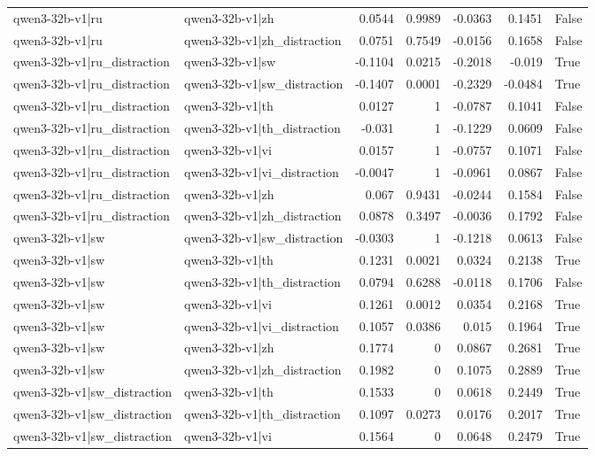 \begin{table}
\begin{tabular}{l l r r r r l}
qwen3-32b-v1|ru & qwen3-32b-v1|zh & 0.0544 & 0.9989 & -0.0363 & 0.1451 & False \\
qwen3-32b-v1|ru & qwen3-32b-v1|zh_distraction & 0.0751 & 0.7549 & -0.0156 & 0.1658 & False \\
qwen3-32b-v1|ru_distraction & qwen3-32b-v1|sw & -0.1104 & 0.0215 & -0.2018 & -0.019 & True \\
qwen3-32b-v1|ru_distraction & qwen3-32b-v1|sw_distraction & -0.1407 & 0.0001 & -0.2329 & -0.0484 & True \\
qwen3-32b-v1|ru_distraction & qwen3-32b-v1|th & 0.0127 & 1 & -0.0787 & 0.1041 & False \\
qwen3-32b-v1|ru_distraction & qwen3-32b-v1|th_distraction & -0.031 & 1 & -0.1229 & 0.0609 & False \\
qwen3-32b-v1|ru_distraction & qwen3-32b-v1|vi & 0.0157 & 1 & -0.0757 & 0.1071 & False \\
qwen3-32b-v1|ru_distraction & qwen3-32b-v1|vi_distraction & -0.0047 & 1 & -0.0961 & 0.0867 & False \\
qwen3-32b-v1|ru_distraction & qwen3-32b-v1|zh & 0.067 & 0.9431 & -0.0244 & 0.1584 & False \\
qwen3-32b-v1|ru_distraction & qwen3-32b-v1|zh_distraction & 0.0878 & 0.3497 & -0.0036 & 0.1792 & False \\
qwen3-32b-v1|sw & qwen3-32b-v1|sw_distraction & -0.0303 & 1 & -0.1218 & 0.0613 & False \\
qwen3-32b-v1|sw & qwen3-32b-v1|th & 0.1231 & 0.0021 & 0.0324 & 0.2138 & True \\
qwen3-32b-v1|sw & qwen3-32b-v1|th_distraction & 0.0794 & 0.6288 & -0.0118 & 0.1706 & False \\
qwen3-32b-v1|sw & qwen3-32b-v1|vi & 0.1261 & 0.0012 & 0.0354 & 0.2168 & True \\
qwen3-32b-v1|sw & qwen3-32b-v1|vi_distraction & 0.1057 & 0.0386 & 0.015 & 0.1964 & True \\
qwen3-32b-v1|sw & qwen3-32b-v1|zh & 0.1774 & 0 & 0.0867 & 0.2681 & True \\
qwen3-32b-v1|sw & qwen3-32b-v1|zh_distraction & 0.1982 & 0 & 0.1075 & 0.2889 & True \\
qwen3-32b-v1|sw_distraction & qwen3-32b-v1|th & 0.1533 & 0 & 0.0618 & 0.2449 & True \\
qwen3-32b-v1|sw_distraction & qwen3-32b-v1|th_distraction & 0.1097 & 0.0273 & 0.0176 & 0.2017 & True \\
qwen3-32b-v1|sw_distraction & qwen3-32b-v1|vi & 0.1564 & 0 & 0.0648 & 0.2479 & True \\

\end{tabular}
\end{table}
